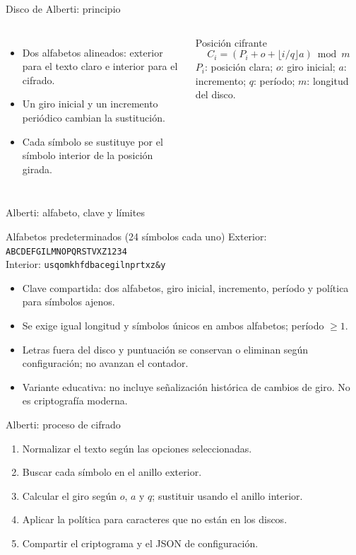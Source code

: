 \documentclass[aspectratio=169,11pt]{beamer}
\begin{document}
\begin{frame}{Disco de Alberti: principio}
  \begin{columns}[T]
      \begin{itemize}
        \item Dos alfabetos alineados: exterior para el texto claro e interior para el cifrado.
        \item Un giro inicial y un incremento periódico cambian la sustitución.
        \item Cada símbolo se sustituye por el símbolo interior de la posición girada.
      \end{itemize}
      \begin{block}{Posición cifrante}
        \[
        C_i=(P_i+o+\lfloor i/q\rfloor a)\bmod m
        \]
        \scriptsize $P_i$: posición clara; $o$: giro inicial; $a$: incremento; $q$: período; $m$: longitud del disco.
      \end{block}
  \end{columns}
\end{frame}

\begin{frame}{Alberti: alfabeto, clave y límites}
  \small
  \begin{block}{Alfabetos predeterminados (24 símbolos cada uno)}
    Exterior: \texttt{ABCDEFGILMNOPQRSTVXZ1234}\\
    Interior: \texttt{usqomkhfdbacegilnprtxz\&y}
  \end{block}
  \begin{itemize}
    \item Clave compartida: dos alfabetos, giro inicial, incremento, período y política para símbolos ajenos.
    \item Se exige igual longitud y símbolos únicos en ambos alfabetos; período $\geq 1$.
    \item Letras fuera del disco y puntuación se conservan o eliminan según configuración; no avanzan el contador.
    \item Variante educativa: no incluye señalización histórica de cambios de giro. No es criptografía moderna.
  \end{itemize}
\end{frame}

\begin{frame}{Alberti: proceso de cifrado}
  \begin{enumerate}
    \item Normalizar el texto según las opciones seleccionadas.
    \item Buscar cada símbolo en el anillo exterior.
    \item Calcular el giro según $o$, $a$ y $q$; sustituir usando el anillo interior.
    \item Aplicar la política para caracteres que no están en los discos.
    \item Compartir el criptograma y el JSON de configuración.
  \end{enumerate}
\end{frame}
\end{document}
